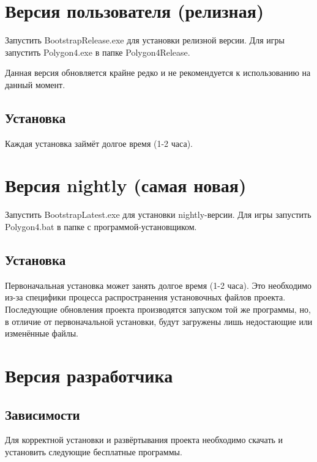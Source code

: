 \documentclass[a4paper,12pt]{report}
\begin{document}
\section{Версия пользователя (релизная)}

Запустить BootstrapRelease.exe для установки релизной версии.
Для игры запустить Polygon4.exe в папке Polygon4Release.

Данная версия обновляется крайне редко и не рекомендуется к использованию на данный момент.

\subsection{Установка}

Каждая установка займёт долгое время (1-2 часа).

\section{Версия nightly (самая новая)}

Запустить BootstrapLatest.exe для установки nightly-версии.
Для игры запустить Polygon4.bat в папке с программой-установщиком.

\subsection{Установка}

Первоначальная установка может занять долгое время (1-2 часа).
Это необходимо из-за специфики процесса распространения установочных файлов проекта.
Последующие обновления проекта производятся запуском той же программы, но, в отличие от первоначальной установки, будут загружены лишь недостающие или изменённые файлы.


\section{Версия разработчика}

\subsection{Зависимости}

Для корректной установки и развёртывания проекта необходимо скачать и установить следующие бесплатные программы.
\end{document}
